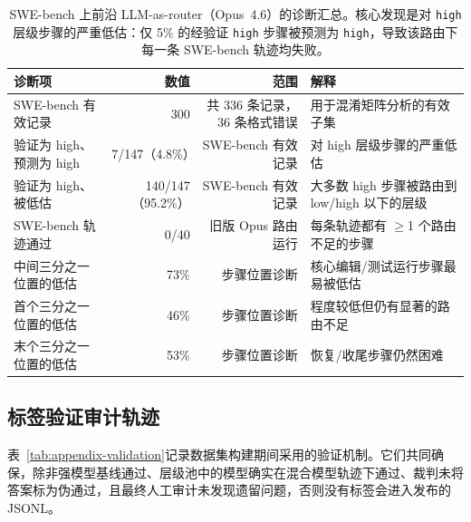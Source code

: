 \begin{table}[ht]
\centering
\small
\caption{SWE-bench 上前沿 LLM-as-router（Opus~4.6）的诊断汇总。核心发现是对 \texttt{high} 层级步骤的严重低估：仅 5\% 的经验证 \texttt{high} 步骤被预测为 \texttt{high}，导致该路由下每一条 SWE-bench 轨迹均失败。}
\label{tab:appendix-opus-bias}
\begin{tabularx}{\linewidth}{lrr X}
\toprule
诊断项 & 数值 & 范围 & 解释 \\
\midrule
SWE-bench 有效记录 & 300 & 共 336 条记录，36 条格式错误 & 用于混淆矩阵分析的有效子集 \\
验证为 high、预测为 high & 7/147（4.8\%） & SWE-bench 有效记录 & 对 high 层级步骤的严重低估 \\
验证为 high、被低估 & 140/147（95.2\%） & SWE-bench 有效记录 & 大多数 high 步骤被路由到 low/high 以下的层级 \\
SWE-bench 轨迹通过 & 0/40 & 旧版 Opus 路由运行 & 每条轨迹都有 $\ge$1 个路由不足的步骤 \\
中间三分之一位置的低估 & 73\% & 步骤位置诊断 & 核心编辑/测试运行步骤最易被低估 \\
首个三分之一位置的低估 & 46\% & 步骤位置诊断 & 程度较低但仍有显著的路由不足 \\
末个三分之一位置的低估 & 53\% & 步骤位置诊断 & 恢复/收尾步骤仍然困难 \\
\bottomrule
\end{tabularx}
\end{table}

\subsection{标签验证审计轨迹}
\label{app:validation}

表~\ref{tab:appendix-validation}记录数据集构建期间采用的验证机制。它们共同确保，除非强模型基线通过、层级池中的模型确实在混合模型轨迹下通过、裁判未将答案标为伪通过，且最终人工审计未发现遗留问题，否则没有标签会进入发布的 JSONL。

